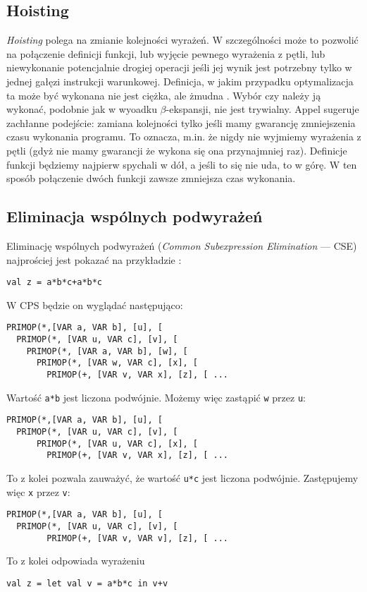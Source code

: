 \documentclass[11pt]{scrartcl}
\begin{document}
\subsection{Hoisting}
\textit{Hoisting} polega na zmianie kolejności wyrażeń. W szczególności może to pozwolić
na połączenie definicji funkcji, lub wyjęcie pewnego wyrażenia z pętli, lub
niewykonanie potencjalnie drogiej operacji jeśli jej wynik jest potrzebny tylko
w jednej gałęzi instrukcji warunkowej. Definicja, w jakim przypadku
optymalizacja ta może być wykonana nie jest ciężka, ale żmudna \cite{Appel8.3}. Wybór
czy należy ją wykonać, podobnie jak w wyoadku $\beta$-ekspansji, nie jest
trywialny. Appel \cite{Appel8.3} sugeruje
zachłanne podejście: zamiana kolejności tylko jeśli mamy gwarancję zmniejszenia
czasu wykonania programu. To oznacza, m.in. że nigdy nie wyjmiemy wyrażenia z pętli
(gdyż nie mamy gwarancji że wykona się ona przynajmniej raz). Definicje funkcji
będziemy najpierw spychali w dół, a jeśli to się nie uda, to w górę. W ten
sposób połączenie dwóch funkcji zawsze zmniejsza czas wykonania.


\subsection{Eliminacja wspólnych podwyrażeń}
Eliminację wspólnych podwyrażeń (\textit{Common Subexpression Elimination} --- CSE) najprościej jest pokazać na przykładzie \cite{Appel9}:
\begin{lstlisting}
val z = a*b*c+a*b*c
\end{lstlisting}

W CPS będzie on wyglądać następująco:
\begin{lstlisting}
PRIMOP(*,[VAR a, VAR b], [u], [
  PRIMOP(*, [VAR u, VAR c], [v], [
    PRIMOP(*, [VAR a, VAR b], [w], [
      PRIMOP(*, [VAR w, VAR c], [x], [
        PRIMOP(+, [VAR v, VAR x], [z], [ ...
\end{lstlisting}

Wartość \lstinline|a*b| jest liczona podwójnie. Możemy więc zastąpić \lstinline|w| przez \lstinline|u|:
\begin{lstlisting}
PRIMOP(*,[VAR a, VAR b], [u], [
  PRIMOP(*, [VAR u, VAR c], [v], [
      PRIMOP(*, [VAR u, VAR c], [x], [
        PRIMOP(+, [VAR v, VAR x], [z], [ ...
\end{lstlisting}

To z kolei pozwala zauważyć, że wartość \lstinline|u*c| jest liczona podwójnie. Zastępujemy więc
\lstinline|x| przez \lstinline|v|:
\begin{lstlisting}
PRIMOP(*,[VAR a, VAR b], [u], [
  PRIMOP(*, [VAR u, VAR c], [v], [
        PRIMOP(+, [VAR v, VAR v], [z], [ ...
\end{lstlisting}
To z kolei odpowiada wyrażeniu
\begin{lstlisting}
val z = let val v = a*b*c in v+v
\end{lstlisting}
\end{document}
